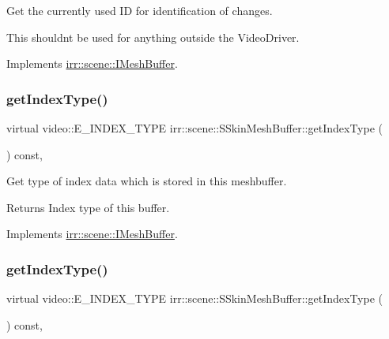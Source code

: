 Get the currently used ID for identification of changes. 

This shouldn\textquotesingle{}t be used for anything outside the Video\+Driver. 

Implements \hyperlink{classirr_1_1scene_1_1IMeshBuffer_aba48df31edf92a0117692c0be02298db}{irr\+::scene\+::\+I\+Mesh\+Buffer}.

\mbox{\label{structirr_1_1scene_1_1SSkinMeshBuffer_a0655e2196cb283a164580ada6c34aecf}} 
\subsubsection{\texorpdfstring{get\+Index\+Type()}{getIndexType()}\hspace{0.1cm}{\footnotesize\ttfamily [1/2]}}
{\footnotesize\ttfamily virtual video\+::\+E\+\_\+\+I\+N\+D\+E\+X\+\_\+\+T\+Y\+PE irr\+::scene\+::\+S\+Skin\+Mesh\+Buffer\+::get\+Index\+Type (\begin{DoxyParamCaption}{ }\end{DoxyParamCaption}) const\hspace{0.3cm}{\ttfamily [inline]}, {\ttfamily [virtual]}}



Get type of index data which is stored in this meshbuffer. 

\begin{DoxyReturn}{Returns}
Index type of this buffer. 
\end{DoxyReturn}


Implements \hyperlink{classirr_1_1scene_1_1IMeshBuffer_a8a993431c2c35420b62a577dc18dbdc2}{irr\+::scene\+::\+I\+Mesh\+Buffer}.

\mbox{\label{structirr_1_1scene_1_1SSkinMeshBuffer_a0655e2196cb283a164580ada6c34aecf}} 
\subsubsection{\texorpdfstring{get\+Index\+Type()}{getIndexType()}\hspace{0.1cm}{\footnotesize\ttfamily [2/2]}}
{\footnotesize\ttfamily virtual video\+::\+E\+\_\+\+I\+N\+D\+E\+X\+\_\+\+T\+Y\+PE irr\+::scene\+::\+S\+Skin\+Mesh\+Buffer\+::get\+Index\+Type (\begin{DoxyParamCaption}{ }\end{DoxyParamCaption}) const\hspace{0.3cm}{\ttfamily [inline]}, {\ttfamily [virtual]}}



